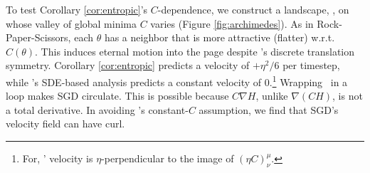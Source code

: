 To test Corollary \ref{cor:entropic}'s $C$-dependence,
we %
construct a landscape, \Helix, on
whose valley of global minima $C$ varies (Figure
\ref{fig:archimedes}).  As in Rock-Paper-Scissors, each 
$\theta$ has a neighbor that is more attractive (flatter) w.r.t.\
$C(\theta)$.  This induces eternal motion into the page
despite \Helix's discrete translation symmetry.
Corollary \ref{cor:entropic} predicts a velocity of
$+\eta^2/6$ per timestep, while \cite{ch18}'s SDE-based analysis
predicts a constant velocity of $0$.\footnote{
    For, \Helix' velocity is $\eta$-perpendicular to the image
    of $(\eta C)^\mu_\nu$.%
}
Wrapping \Helix\ in a loop makes SGD circulate. %
This is
possible because $C\nabla H$, unlike $\nabla(CH)$, is not a total
derivative. 
In avoiding \cite{we19b}'s constant-$C$ assumption, we 
find that SGD's velocity field can have curl. 

